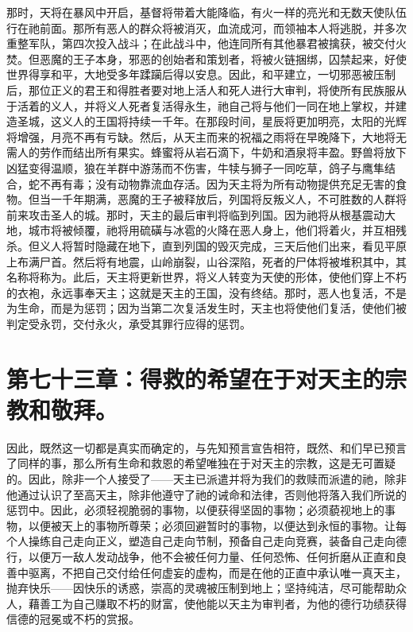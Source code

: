 那时，天将在暴风中开启，基督将带着大能降临，有火一样的亮光和无数天使队伍行在祂前面。那所有恶人的群众将被消灭，血流成河，而领袖本人将逃脱，并多次重整军队，第四次投入战斗；在此战斗中，他连同所有其他暴君被擒获，被交付火焚。但恶魔的王子本身，邪恶的创始者和策划者，将被火链捆绑，囚禁起来，好使世界得享和平，大地受多年蹂躏后得以安息。因此，和平建立，一切邪恶被压制后，那位正义的君王和得胜者要对地上活人和死人进行大审判，将使所有民族服从于活着的义人，并将义人死者复活得永生，祂自己将与他们一同在地上掌权，并建造圣城，这义人的王国将持续一千年。在那段时间，星辰将更加明亮，太阳的光辉将增强，月亮不再有亏缺。然后，从天主而来的祝福之雨将在早晚降下，大地将无需人的劳作而结出所有果实。蜂蜜将从岩石滴下，牛奶和酒泉将丰盈。野兽将放下凶猛变得温顺，狼在羊群中游荡而不伤害，牛犊与狮子一同吃草，鸽子与鹰隼结合，蛇不再有毒；没有动物靠流血存活。因为天主将为所有动物提供充足无害的食物。但当一千年期满，恶魔的王子被释放后，列国将反叛义人，不可胜数的人群将前来攻击圣人的城。那时，天主的最后审判将临到列国。因为祂将从根基震动大地，城市将被倾覆，祂将用硫磺与冰雹的火降在恶人身上，他们将着火，并互相残杀。但义人将暂时隐藏在地下，直到列国的毁灭完成，三天后他们出来，看见平原上布满尸首。然后将有地震，山岭崩裂，山谷深陷，死者的尸体将被堆积其中，其名称将称为。此后，天主将更新世界，将义人转变为天使的形体，使他们穿上不朽的衣袍，永远事奉天主；这就是天主的王国，没有终结。那时，恶人也复活，不是为生命，而是为惩罚；因为当第二次复活发生时，天主也将使他们复活，使他们被判定受永罚，交付永火，承受其罪行应得的惩罚。\par


\section{第七十三章：得救的希望在于对天主的宗教和敬拜。}

因此，既然这一切都是真实而确定的，与先知预言宣告相符，既然、和们早已预言了同样的事，那么所有生命和救恩的希望唯独在于对天主的宗教，这是无可置疑的。因此，除非一个人接受了——天主已派遣并将为我们的救赎而派遣的祂，除非他通过认识了至高天主，除非他遵守了祂的诫命和法律，否则他将落入我们所说的惩罚中。因此，必须轻视脆弱的事物，以便获得坚固的事物；必须藐视地上的事物，以便被天上的事物所尊荣；必须回避暂时的事物，以便达到永恒的事物。让每个人操练自己走向正义，塑造自己走向节制，预备自己走向竞赛，装备自己走向德行，以便万一敌人发动战争，他不会被任何力量、任何恐怖、任何折磨从正直和良善中驱离，不把自己交付给任何虚妄的虚构，而是在他的正直中承认唯一真天主，抛弃快乐——因快乐的诱惑，崇高的灵魂被压制到地上；坚持纯洁，尽可能帮助众人，藉善工为自己赚取不朽的财富，使他能以天主为审判者，为他的德行功绩获得信德的冠冕或不朽的赏报。\par

